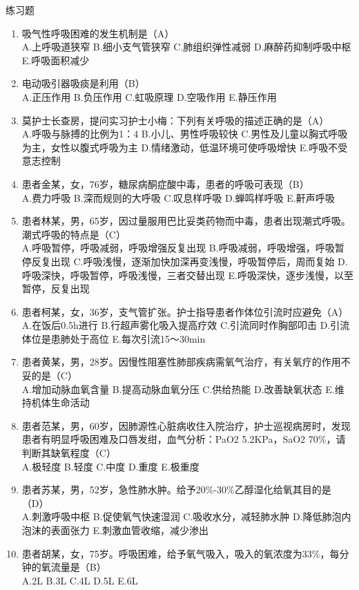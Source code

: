 \documentclass[11pt, a4paper]{ctexart}
\begin{document}
\begin{examplebox}{练习题}
\begin{enumerate}
    \item 吸气性呼吸困难的发生机制是（A）\\
    A.上呼吸道狭窄 \quad B.细小支气管狭窄 \quad C.肺组织弹性减弱 \quad D.麻醉药抑制呼吸中枢 \quad E.呼吸面积减少
    \item 电动吸引器吸痰是利用（B）\\
    A.正压作用 \quad B.负压作用 \quad C.虹吸原理 \quad D.空吸作用 \quad E.静压作用
    \item 莫护士长查房，提问实习护士小梅：下列有关呼吸的描述正确的是（A）\\
    A.呼吸与脉搏的比例为1：4 \quad B.小儿、男性呼吸较快 \quad C.男性及儿童以胸式呼吸为主，女性以腹式呼吸为主 \quad D.情绪激动，低温环境可使呼吸增快 \quad E.呼吸不受意志控制
    \item 患者金某，女，76岁，糖尿病酮症酸中毒，患者的呼吸可表现（B）\\
    A.费力呼吸 \quad B.深而规则的大呼吸 \quad C.叹息样呼吸 \quad D.蝉鸣样呼吸 \quad E.鼾声呼吸
    \item 患者林某，男，65岁，因过量服用巴比妥类药物而中毒，患者出现潮式呼吸。潮式呼吸的特点是（C）\\
    A.呼吸暂停，呼吸减弱，呼吸增强反复出现 \quad B.呼吸减弱，呼吸增强，呼吸暂停反复出现 \quad C.呼吸浅慢，逐渐加快加深再变浅慢，呼吸暂停后，周而复始 \quad D.呼吸深快，呼吸暂停，呼吸浅慢，三者交替出现 \quad E.呼吸深快，逐步浅慢，以至暂停，反复出现
    \item 患者柯某，女，36岁，支气管扩张。护士指导患者作体位引流时应避免（A）\\
    A.在饭后0.5h进行 \quad B.行超声雾化吸入提高疗效 \quad C.引流同时作胸部叩击 \quad D.引流体位是患肺处于高位 \quad E.每次引流15～30min
    \item 患者黄某，男，28岁。因慢性阻塞性肺部疾病需氧气治疗，有关氧疗的作用不妥的是（C）\\
    A.增加动脉血氧含量 \quad B.提高动脉血氧分压 \quad C.供给热能 \quad D.改善缺氧状态 \quad E.维持机体生命活动
    \item 患者范某，男，60岁，因肺源性心脏病收住入院治疗，护士巡视病房时，发现患者有明显呼吸困难及口唇发绀，血气分析：PaO2 5.2KPa，SaO2 70\%，请判断其缺氧程度（C）\\
    A.极轻度 \quad B.轻度 \quad C.中度 \quad D.重度 \quad E.极重度
    \item 患者苏某，男，52岁，急性肺水肿。给予20\%-30\%乙醇湿化给氧其目的是（D）\\
    A.刺激呼吸中枢 \quad B.促使氧气快速湿润 \quad C.吸收水分，减轻肺水肿 \quad D.降低肺泡内泡沫的表面张力 \quad E.刺激血管收缩，减少渗出
    \item 患者胡某，女，75岁。呼吸困难，给予氧气吸入，吸入的氧浓度为33\%，每分钟的氧流量是（B）\\
    A.2L \quad B.3L \quad C.4L \quad D.5L \quad E.6L
\end{enumerate}
\end{examplebox}
\end{document}
